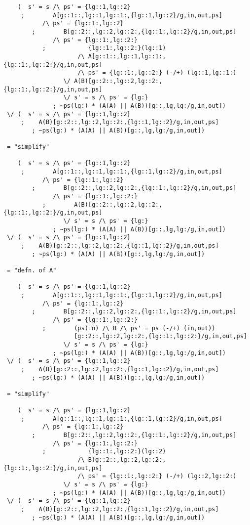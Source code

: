 \begin{verbatim}
    (  s' = s /\ ps' = {lg::1,lg::2}
     ;        A[g::1::,lg::1,lg::1:,{lg::1,lg::2}/g,in,out,ps]
           /\ ps' = {lg::1:,lg::2}
        ;        B[g::2::,lg::2,lg::2:,{lg::1:,lg::2}/g,in,out,ps]
              /\ ps' = {lg::1:,lg::2:}
           ;            {lg::1:,lg::2:}(lg::1)
                     /\ A[g::1::,lg::1,lg::1:,{lg::1:,lg::2:}/g,in,out,ps]
                     /\ ps' = {lg::1:,lg::2:} (-/+) (lg::1,lg::1:)
                 \/ A(B)[g::2::,lg::2,lg::2:,{lg::1:,lg::2:}/g,in,out,ps]
                 \/ s' = s /\ ps' = {lg:}
              ; ~ps(lg:) * (A(A) || A(B))[g::,lg,lg:/g,in,out])
 \/ (  s' = s /\ ps' = {lg::1,lg::2}
     ;    A(B)[g::2::,lg::2,lg::2:,{lg::1,lg::2}/g,in,out,ps]
        ; ~ps(lg:) * (A(A) || A(B))[g::,lg,lg:/g,in,out])

 = "simplify"

    (  s' = s /\ ps' = {lg::1,lg::2}
     ;        A[g::1::,lg::1,lg::1:,{lg::1,lg::2}/g,in,out,ps]
           /\ ps' = {lg::1:,lg::2}
        ;        B[g::2::,lg::2,lg::2:,{lg::1:,lg::2}/g,in,out,ps]
              /\ ps' = {lg::1:,lg::2:}
           ;        A(B)[g::2::,lg::2,lg::2:,{lg::1:,lg::2:}/g,in,out,ps]
                 \/ s' = s /\ ps' = {lg:}
              ; ~ps(lg:) * (A(A) || A(B))[g::,lg,lg:/g,in,out])
 \/ (  s' = s /\ ps' = {lg::1,lg::2}
     ;    A(B)[g::2::,lg::2,lg::2:,{lg::1,lg::2}/g,in,out,ps]
        ; ~ps(lg:) * (A(A) || A(B))[g::,lg,lg:/g,in,out])

 = "defn. of A"

    (  s' = s /\ ps' = {lg::1,lg::2}
     ;        A[g::1::,lg::1,lg::1:,{lg::1,lg::2}/g,in,out,ps]
           /\ ps' = {lg::1:,lg::2}
        ;        B[g::2::,lg::2,lg::2:,{lg::1:,lg::2}/g,in,out,ps]
              /\ ps' = {lg::1:,lg::2:}
           ;        (ps(in) /\ B /\ ps' = ps (-/+) (in,out))
                    [g::2::,lg::2,lg::2:,{lg::1:,lg::2:}/g,in,out,ps]
                 \/ s' = s /\ ps' = {lg:}
              ; ~ps(lg:) * (A(A) || A(B))[g::,lg,lg:/g,in,out])
 \/ (  s' = s /\ ps' = {lg::1,lg::2}
     ;    A(B)[g::2::,lg::2,lg::2:,{lg::1,lg::2}/g,in,out,ps]
        ; ~ps(lg:) * (A(A) || A(B))[g::,lg,lg:/g,in,out])

 = "simplify"

    (  s' = s /\ ps' = {lg::1,lg::2}
     ;        A[g::1::,lg::1,lg::1:,{lg::1,lg::2}/g,in,out,ps]
           /\ ps' = {lg::1:,lg::2}
        ;        B[g::2::,lg::2,lg::2:,{lg::1:,lg::2}/g,in,out,ps]
              /\ ps' = {lg::1:,lg::2:}
           ;            {lg::1:,lg::2:}(lg::2)
                     /\ B[g::2::,lg::2,lg::2:,{lg::1:,lg::2:}/g,in,out,ps]
                     /\ ps' = {lg::1:,lg::2:} (-/+) (lg::2,lg::2:)
                 \/ s' = s /\ ps' = {lg:}
              ; ~ps(lg:) * (A(A) || A(B))[g::,lg,lg:/g,in,out])
 \/ (  s' = s /\ ps' = {lg::1,lg::2}
     ;    A(B)[g::2::,lg::2,lg::2:,{lg::1,lg::2}/g,in,out,ps]
        ; ~ps(lg:) * (A(A) || A(B))[g::,lg,lg:/g,in,out])


\end{verbatim}

